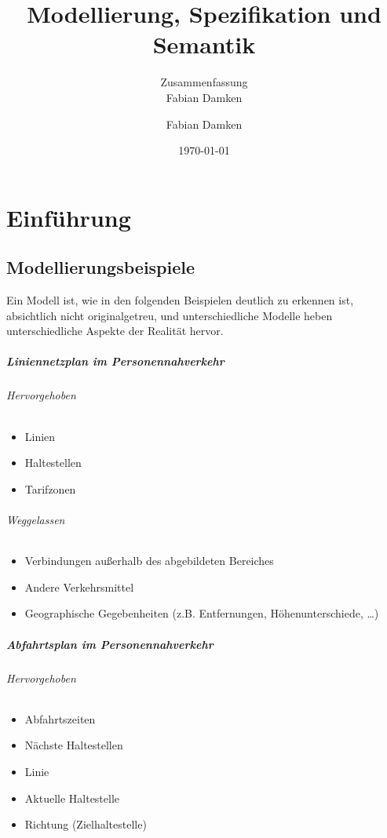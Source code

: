 \documentclass[a4paper, 11pt, accentcolor = tud3b]{tudreport}
\title{Modellierung, Spezifikation und Semantik}
\subtitle{Zusammenfassung \\ Fabian Damken}
\author{Fabian Damken}
\date{\today}
\begin{document}
    \maketitle
    \tableofcontents
    \listoftodos

    \chapter{Einführung}
	    \section{Modellierungsbeispiele}
		    Ein Modell ist, wie in den folgenden Beispielen deutlich zu erkennen ist, absichtlich nicht originalgetreu, und unterschiedliche Modelle heben unterschiedliche Aspekte der Realität hervor.

		    \paragraph{Liniennetzplan im Personennahverkehr}
			    \subparagraph{Hervorgehoben}
				    \begin{itemize}
				    	\item Linien
				    	\item Haltestellen
				    	\item Tarifzonen
				    \end{itemize}

			    \subparagraph{Weggelassen}
				    \begin{itemize}
				    	\item Verbindungen außerhalb des abgebildeten Bereiches
				    	\item Andere Verkehrsmittel
				    	\item Geographische Gegebenheiten (z.B. Entfernungen, Höhenunterschiede, \dots)
				    \end{itemize}

		    \paragraph{Abfahrtsplan im Personennahverkehr}
			    \subparagraph{Hervorgehoben}
				    \begin{itemize}
					    \item Abfahrtszeiten
					    \item Nächste Haltestellen
					    \item Linie
					    \item Aktuelle Haltestelle
					    \item Richtung (Zielhaltestelle)
				    \end{itemize}
			    
\end{document}
